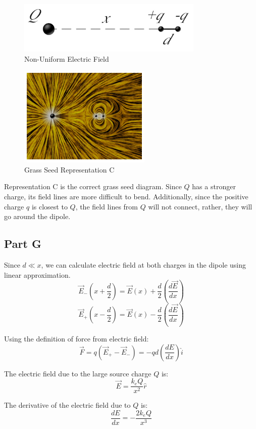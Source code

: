 \documentclass{article}
\begin{document}
\begin{figure}[H]
  \centering
  \includegraphics[scale=0.5]{"NonUniformElectricField"}
  \caption{Non-Uniform Electric Field}
\end{figure}

\begin{figure}[H]
  \centering
  \includegraphics[scale=0.74]{"GrassSeedRepresentationC"}
  \caption{Grass Seed Representation C}
\end{figure}

Representation C is the correct grass seed diagram. Since $Q$ has a stronger
charge, its field lines are more difficult to bend.  Additionally, since the
positive charge $q$ is closest to $Q$, the field lines from $Q$ will not
connect, rather, they will go around the dipole.

\subsection*{Part G}

Since $d \ll x$, we can calculate electric field at both charges in the dipole
using linear approximation.
$$ \vec{E}_{-}\left(x + \frac{ d }{ 2 } \right) = \vec{E}(x) + \frac{ d }{ 2 }
\left( \frac{ d\vec{E} }{ dx } \right) $$
$$ \vec{E}_{+}\left(x - \frac{ d }{ 2 } \right) = \vec{E}(x) - \frac{ d }{ 2 }
\left( \frac{ d\vec{E} }{ dx } \right) $$

Using the definition of force from electric field:
$$ \vec{F} = q(\vec{E}_{+} - \vec{E}_{-}) = -qd \left( \frac{ dE }{ dx } \right)
\hat{i} $$

The electric field due to the large source charge $Q$ is:
$$ \vec{E} = \frac{ k_{e} Q }{ x^{2} } \hat{r} $$

The derivative of the electric field due to $Q$ is:
$$ \frac{ dE }{ dx } = - \frac{ 2 k_{e} Q }{ x^{3} } $$
\end{document}
